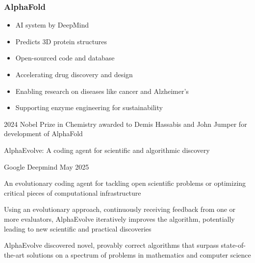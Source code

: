 \begin{frame}
    
    \begin{figure}
       \centering
    \end{figure}

\end{frame}

\begin{frame}\frametitle{AlphaFold}

    \begin{itemize}
        \item AI system by DeepMind 
            \vspace{0.5em}
        \item Predicts 3D protein structures
            \vspace{0.5em}
        \item Open-sourced code and database 
            \vspace{0.5em}
        \item Accelerating drug discovery and design
            \vspace{0.5em}
        \item Enabling research on diseases like cancer and Alzheimer's
            \vspace{0.5em}
        \item Supporting enzyme engineering for sustainability
    \end{itemize}

            \vspace{0.5em}
            \vspace{0.5em}
            \vspace{0.5em}
    2024 Nobel Prize in Chemistry awarded to Demis Hassabis and John
    Jumper for development of AlphaFold

\end{frame}


\begin{frame}
    
    AlphaEvolve: A coding agent for scientific and algorithmic discovery

    Google Deepmind May 2025

    An evolutionary coding agent for tackling open scientific problems or
    optimizing critical pieces of computational infrastructure

    Using an evolutionary approach, continuously receiving feedback from one or
    more evaluators, AlphaEvolve iteratively improves the algorithm,
    potentially leading to new scientific and practical discoveries

    AlphaEvolve discovered novel, provably correct algorithms that surpass
    state-of-the-art solutions on a spectrum of problems in mathematics and
    computer science

\end{frame}

